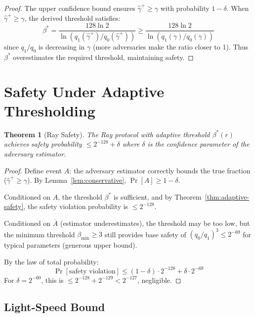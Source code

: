 \documentclass[11pt,a4paper]{article}
\newtheorem{theorem}{Theorem}[section]
\begin{document}
\begin{proof}
The upper confidence bound ensures $\hat{\gamma}^+ \geq \gamma$ with probability $1 - \delta$.
When $\hat{\gamma}^+ \geq \gamma$, the derived threshold satisfies:
\[
\beta^* = \frac{128 \ln 2}{\ln(q_1(\hat{\gamma}^+) / q_0(\hat{\gamma}^+))} \geq \frac{128 \ln 2}{\ln(q_1(\gamma) / q_0(\gamma))}
\]
since $q_1/q_0$ is decreasing in $\gamma$ (more adversaries make the ratio closer to 1).
Thus $\beta^*$ overestimates the required threshold, maintaining safety.
\end{proof}

\section{Safety Under Adaptive Thresholding}
\label{sec:safety}

\begin{theorem}[Ray Safety]
\label{thm:ray-safety}
The Ray protocol with adaptive threshold $\beta^*(r)$ achieves safety probability
$\leq 2^{-128} + \delta$ where $\delta$ is the confidence parameter of the adversary
estimator.
\end{theorem}

\begin{proof}
Define event $A$: the adversary estimator correctly bounds the true fraction
($\hat{\gamma}^+ \geq \gamma$). By Lemma~\ref{lem:conservative}, $\Pr[A] \geq 1 - \delta$.

Conditioned on $A$, the threshold $\beta^*$ is sufficient, and by Theorem~\ref{thm:adaptive-safety},
the safety violation probability is $\leq 2^{-128}$.

Conditioned on $\overline{A}$ (estimator underestimates), the threshold may be too low,
but the minimum threshold $\beta_{\min} \geq 3$ still provides base safety of
$(q_0/q_1)^3 \leq 2^{-69}$ for typical parameters (generous upper bound).

By the law of total probability:
\[
\Pr[\text{safety violation}] \leq (1 - \delta) \cdot 2^{-128} + \delta \cdot 2^{-69}
\]
For $\delta = 2^{-60}$, this is $\leq 2^{-128} + 2^{-129} < 2^{-127}$, negligible.
\end{proof}

\subsection{Light-Speed Bound}
\end{document}
